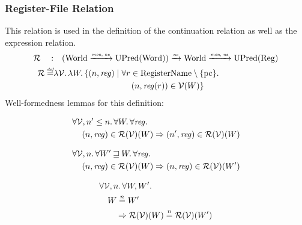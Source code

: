\documentclass[a4paper]{article}
\newcommand{\monnefun}{\xrightarrow{\textit{\tiny{mon, ne}}}}
\newcommand{\nefun}{\xrightarrow{\textit{\tiny{ne}}}}
\newcommand{\defeq}{\stackrel{\textit{\tiny{def}}}{=}}
\newcommand{\nequal}[1][n]{\stackrel{\tiny{#1}}{=}}
\newcommand{\var}[1]{\mathit{#1}}
\newcommand{\pcreg}{\mathrm{pc}}
\newcommand{\reg}{\var{reg}}
\newcommand{\future}{\mathbin{\sqsupseteq}}
\newcommand{\asmType}{\plaindom{AsmType}}
\newcommand{\plaindom}[1]{\mathrm{#1}}
\newcommand{\Words}{\plaindom{Word}}
\newcommand{\RegName}{\plaindom{RegisterName}}
\newcommand{\Regs}{\plaindom{Reg}}
\newcommand{\Worlds}{\plaindom{World}}
\newcommand{\UPred}[1]{\plaindom{UPred}(#1)}
\newcommand{\intr}[2]{\mathcal{#1}}
\newcommand{\valueintr}[1]{\intr{V}{#1}}
\newcommand{\regintr}[1]{\intr{R}{#1}}
\newcommand{\stdvr}{\valueintr{\asmType}}
\newcommand{\stdrr}{\regintr{\asmType}}
\newcommand{\npair}[2][n]{\left(#1,#2 \right)}
\begin{document}
\subsubsection{Register-File Relation}
\label{subsubsec:register-file-relation}
This relation is used in the definition of the continuation relation as well as the expression relation.
\begin{align*}
  \stdrr \quad : & \quad (\Worlds \monnefun \UPred{\Words}) \nefun \Worlds \monnefun \UPred{\Regs} \\
  \stdrr \defeq & \lambda \stdvr \ldotp \lambda W \ldotp
                     \begin{aligned}[t]
                       \{ \npair{\reg} \mid & \;\forall r \in \RegName \setminus \{\pcreg\} \ldotp \\
                                            & \;\quad  \npair{\reg(r)} \in \stdvr(W) \}
                     \end{aligned}
\end{align*}
Well-formedness lemmas for this definition:
\begin{lemma}
\label{lem:reg-dc}
  \begin{align*}
    &\forall \stdvr, n' \leq n \ldotp \forall W \ldotp \forall \reg \ldotp\\
    &\quad \npair{\reg} \in \stdrr(\stdvr)(W) \Rightarrow \npair[n']{\reg} \in \stdrr(\stdvr)(W)
  \end{align*}
\end{lemma}

\begin{lemma}
\label{lem:reg-mono-worlds}
  \begin{align*}
    &\forall \stdvr, n \ldotp \forall W' \future W \ldotp \forall \reg \ldotp\\
    &\quad \npair{\reg} \in \stdrr(\stdvr)(W) \Rightarrow \npair{\reg} \in \stdrr(\stdvr)(W')
  \end{align*}
\end{lemma}

\begin{lemma}
  \label{lem:reg-ne-worlds}
  \begin{align*}
    &\forall \stdvr, n \ldotp \forall W, W' \ldotp \\
    &\quad W \nequal W' \\
    &\qquad \Rightarrow \stdrr(\stdvr)(W) \nequal \stdrr(\stdvr)(W')
  \end{align*}
\end{lemma}
\end{document}

